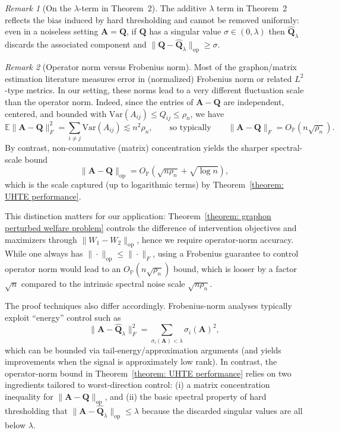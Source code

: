 \documentclass[11pt]{article}
\newcommand{\<}{\langle}
\renewcommand{\>}{\rangle}
\theoremstyle{plain}
\theoremstyle{definition}
\theoremstyle{remark}
\newtheorem{remark}{Remark}
\begin{document}
{\begin{remark}[On the $\lambda$-term in Theorem~2]
The additive $\lambda$ term in Theorem~2 reflects the bias induced by hard thresholding and cannot be removed
uniformly: even in a noiseless setting $\mathbf A=\mathbf Q$, if $\mathbf Q$ has a singular value $\sigma\in(0,\lambda)$
then $\widehat{\mathbf Q}_\lambda$ discards the associated component and $\|\mathbf Q-\widehat{\mathbf Q}_\lambda\|_{\mathrm{op}}
\ge \sigma$.
\end{remark}

\begin{remark}[Operator norm versus Frobenius norm]
Most of the graphon/matrix estimation literature measures error in (normalized) Frobenius norm or related
$L^2$-type metrics. In our setting, these norms lead to a very different fluctuation scale than the operator norm.
Indeed, since the entries of $\mathbf A-\mathbf Q$ are independent, centered, and bounded with
$\mathrm{Var}(A_{ij})\le Q_{ij}\le \rho_n$, we have
\[
\mathbb E\|\mathbf A-\mathbf Q\|_F^2
=\sum_{i\neq j}\mathrm{Var}(A_{ij})
\lesssim n^2\rho_n,
\qquad\text{so typically}\qquad
\|\mathbf A-\mathbf Q\|_F = O_{\mathbb P}(n\sqrt{\rho_n}).
\]
By contrast, non-commutative (matrix) concentration yields the sharper spectral-scale bound
\[
\|\mathbf A-\mathbf Q\|_{\mathrm{op}} = O_{\mathbb P}\!\left(\sqrt{n\rho_n}+\sqrt{\log n}\right),
\]
which is the scale captured (up to logarithmic terms) by Theorem~\ref{theorem: UHTE performance}.

This distinction matters for our application: Theorem~\ref{theorem: graphon perturbed welfare problem} controls the difference of intervention objectives and
maximizers through $\|W_1-W_2\|_{\mathrm{op}}$, hence we require operator-norm accuracy. While one always has
$\|\cdot\|_{\mathrm{op}}\le \|\cdot\|_F$, using a Frobenius guarantee to control operator norm would lead to an
$O_{\mathbb P}(n\sqrt{\rho_n})$ bound, which is looser by a factor $\sqrt n$ compared to the intrinsic spectral noise
scale $\sqrt{n\rho_n}$.

The proof techniques also differ accordingly. Frobenius-norm analyses typically exploit ``energy'' control such as
\[
\|\mathbf A-\widehat{\mathbf Q}_\lambda\|_F^2
=\sum_{\sigma_i(\mathbf A)<\lambda}\sigma_i(\mathbf A)^2,
\]
which can be bounded via tail-energy/approximation arguments (and yields improvements when the signal is
approximately low rank).
In contrast, the operator-norm bound in Theorem~\ref{theorem: UHTE performance} relies on two ingredients tailored to worst-direction control:
(i) a matrix concentration inequality for $\|\mathbf A-\mathbf Q\|_{\mathrm{op}}$, and (ii) the basic spectral property of
hard thresholding that $\|\mathbf A-\widehat{\mathbf Q}_\lambda\|_{\mathrm{op}}\le \lambda$ because the discarded singular
values are all below $\lambda$.
\end{remark}

}
\end{document}
